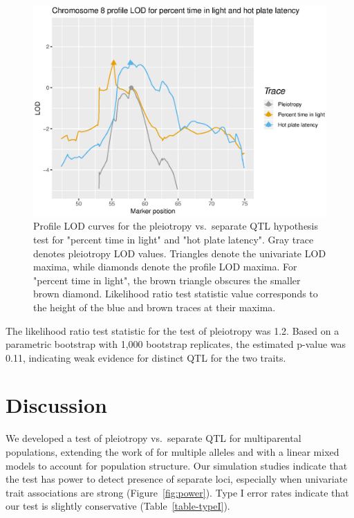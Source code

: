 \documentclass[12pt,twoside, lineno]{gsajnl}
\begin{document}
\begin{figure}
\includegraphics[width = \textwidth]{../Rmd/profile.eps}
\caption{Profile LOD curves for the pleiotropy vs.\ separate QTL
  hypothesis test for "percent time in light" and "hot plate latency".
  Gray trace denotes pleiotropy LOD values. Triangles denote the
  univariate LOD maxima, while diamonds denote the profile LOD maxima.
  For "percent time in light", the brown triangle obscures the
  smaller brown diamond. Likelihood ratio test statistic value
  corresponds to the height of the blue and brown traces at their
  maxima.}
\label{fig:profiles}
\end{figure}

The likelihood ratio test statistic for the test of pleiotropy was
1.2. Based on a parametric bootstrap with 1,000 bootstrap replicates,
the estimated p-value was 0.11, indicating weak
evidence for distinct QTL for the two traits.









\section{Discussion}

We developed a test of pleiotropy vs.\ separate QTL for multiparental
populations, extending the work of \citet{jiang1995multiple} for
multiple alleles and with a linear mixed models to account for
population structure. Our simulation
studies indicate that the test has power to detect presence of
separate loci, especially when univariate trait associations are
strong (Figure~\ref{fig:power}). Type I error rates indicate that our
test is slightly conservative (Table~\ref{table-typeI}).
\end{document}
